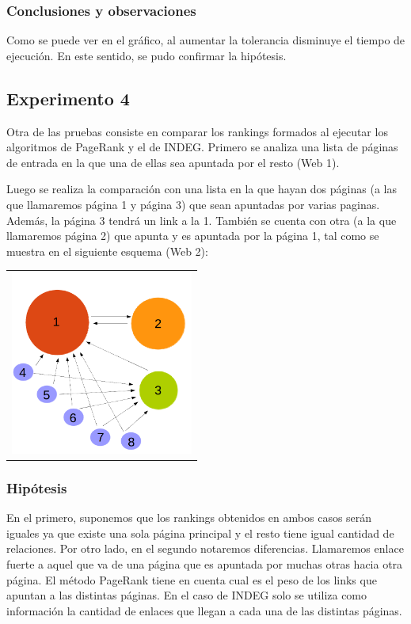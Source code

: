 		\subsubsection*{Conclusiones y observaciones}
		Como se puede ver en el gráfico, al aumentar la tolerancia disminuye el tiempo de ejecución. En este sentido, se pudo confirmar la hipótesis.  

	

	\subsection{Experimento 4}
	Otra de las pruebas consiste en comparar los rankings formados al ejecutar los algoritmos de PageRank y el de INDEG. Primero se analiza una lista de páginas de entrada en la que una de ellas sea apuntada por el resto (Web 1). 

	Luego se realiza la comparación con una lista en la que hayan dos páginas (a las que llamaremos página 1 y página 3) que sean apuntadas por varias paginas. Además, la página 3 tendrá un link a la 1. También se cuenta con otra (a la que llamaremos página 2) que apunta y es apuntada por la página 1, tal como se muestra en el siguiente esquema (Web 2):

			{\centering \begin{tabular}{c}
		      \includegraphics[width=6cm]{../../src/exp/graficos/exp4-graph.png} \\
		    \end{tabular}}

		\subsubsection*{Hipótesis} 
		En el primero, suponemos que los rankings obtenidos en ambos casos serán iguales ya que existe una sola página principal y el resto tiene igual cantidad de relaciones. Por otro lado, en el segundo notaremos diferencias. Llamaremos enlace fuerte a aquel que va de una página que es apuntada por muchas otras hacia otra página. El método PageRank tiene en cuenta cual es el peso de los links que apuntan a las distintas páginas. En el caso de INDEG solo se utiliza como información la cantidad de enlaces que llegan a cada una de las distintas páginas.

